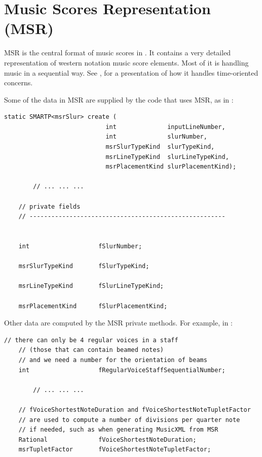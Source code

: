 
\chapter{Music Scores Representation (MSR)}

MSR is the central format of music scores in \mf. It contains a very detailed representation of western notation music score elements. Most of it is handling music in a sequential way. See , for a presentation of how it handles time-oriented concerns.

Some of the data in MSR are supplied by the code that uses MSR, as in :
\begin{lstlisting}[language=CPlusPlus]
    static SMARTP<msrSlur> create (
                            int              inputLineNumber,
                            int              slurNumber,
                            msrSlurTypeKind  slurTypeKind,
                            msrLineTypeKind  slurLineTypeKind,
                            msrPlacementKind slurPlacementKind);

		// ... ... ...

    // private fields
    // ------------------------------------------------------


    int                   fSlurNumber;

    msrSlurTypeKind       fSlurTypeKind;

    msrLineTypeKind       fSlurLineTypeKind;

    msrPlacementKind      fSlurPlacementKind;
\end{lstlisting}

Other data are computed by the MSR private methods. For example, in :
\begin{lstlisting}[language=CPlusPlus]
    // there can only be 4 regular voices in a staff
    // (those that can contain beamed notes)
    // and we need a number for the orientation of beams
    int                   fRegularVoiceStaffSequentialNumber;

		// ... ... ...

    // fVoiceShortestNoteDuration and fVoiceShortestNoteTupletFactor
    // are used to compute a number of divisions per quarter note
    // if needed, such as when generating MusicXML from MSR
    Rational              fVoiceShortestNoteDuration;
    msrTupletFactor       fVoiceShortestNoteTupletFactor;
\end{lstlisting}

